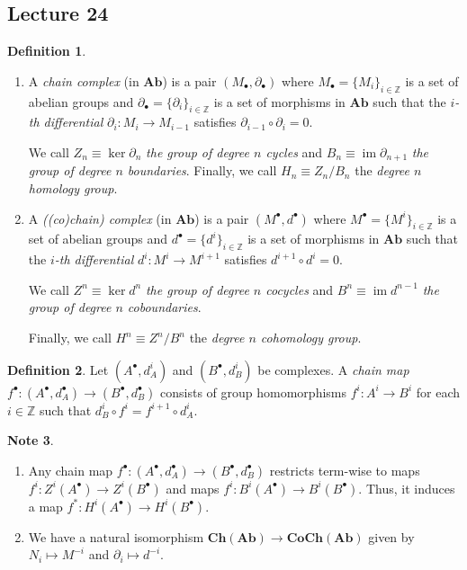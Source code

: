 \documentclass[10pt,letterpaper,cm]{nupset}
\theoremstyle{definition}
\newtheorem{definition}{Definition}[subsection]
\newtheorem{note}[definition]{Note}
\theoremstyle{theorem}
\theoremstyle{remark}
\newcommand{\Z}{\mathbb Z}
\newcommand{\1}{\mathbf{1}}
\newcommand{\0}{\vec 0}
\DeclareMathOperator{\im}{im}
\begin{document}
\subsection{Lecture 24}

\begin{definition} $ $
\begin{enumerate}
\item  A \textit{chain complex} (in $\mathbf{Ab}$) is a pair $\left(M_{\bullet}, \partial_{\bullet}\right)$ where $M_{\bullet} = \{M_i\}_{i\in \Z}$ is a set of abelian groups and $\partial_{\bullet} =\{\partial_i\}_{i\in \Z}$ is a set of morphisms in $\mathbf{Ab}$ such that the \textit{$i$-th differential} $\partial_i : M_i \to M_{i-1}$ satisfies $\partial_{i-1} \circ \partial_i = 0$. 

We call $Z_n \equiv \ker{\partial_{n}}$ \textit{the group of degree $n$ cycles} and $B_n \equiv \im{\partial_{n+1}}$ \textit{the group of degree $n$ boundaries}. Finally, we call $H_n \equiv Z_n/B_n$ the \textit{degree $n$ homology group}.
\item A \textit{((co)chain) complex} (in $\mathbf{Ab}$) is a pair $\left(M^{\bullet}, d^{\bullet}\right)$ where $M^{\bullet} = \{M^i\}_{i\in \Z}$ is a set of abelian groups and $d^{\bullet} =\{d^i\}_{i\in \Z}$ is a set of morphisms in $\mathbf{Ab}$ such that the \textit{$i$-th differential} $d^i : M^i \to M^{i+1}$ satisfies $d^{i+1} \circ d^i = 0$. 

We call $Z^n \equiv \ker{d^n}$ \textit{the group of degree $n$ cocycles} and $B^n \equiv \im{d^{n-1}}$ \textit{the group of degree $n$ coboundaries}. 

Finally, we call $H^n \equiv Z^n/B^n$ the \textit{degree $n$ cohomology group}.
\end{enumerate}
\end{definition}

\begin{definition} Let $\left(A^{\bullet}, d_A^i\right)$ and $\left(B^{\bullet}, d_B^i\right)$ be complexes.
 A \textit{chain map} $f^{\bullet} : \left(A^{\bullet}, d_A^{\bullet}\right) \to \left(B^{\bullet}, d_B^{\bullet}\right)$ consists of group homomorphisms $f^i : A^i \to B^i$ for each $i\in \Z$ such that $d_B^i \circ f^i = f^{i+1} \circ d^i_A$. 
\end{definition}

\begin{note} $ $
\begin{enumerate}
\item Any chain map $f^{\bullet}: \left(A^{\bullet}, d_A^{\bullet}\right) \to \left(B^{\bullet}, d_B^{\bullet}\right)$ restricts term-wise to maps $f^i :Z^i(A^{\bullet}) \to Z^i(B^{\bullet})$ and maps $f^i : B^i(A^{\bullet}) \to B^i(B^{\bullet})$. Thus, it induces a map $f^{\ast} : H^i(A^{\bullet}) \to H^i(B^{\bullet})$.
\item We have a natural isomorphism $\mathbf{Ch}(\mathbf{Ab}) \to \mathbf{CoCh}(\mathbf{Ab})$ given by $N_i \mapsto M^{-i}$ and $\partial_i \mapsto d^{-i}$.
\end{enumerate}
\end{note}
\end{document}
